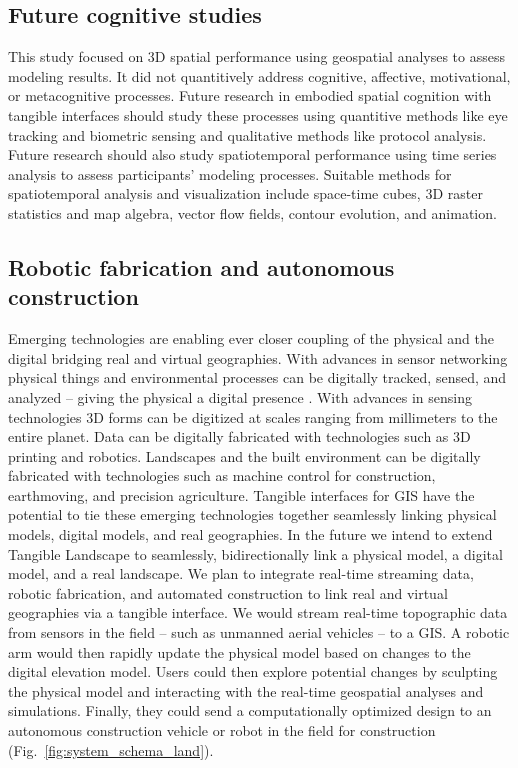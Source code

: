 \documentclass[prodmode,acmtochi]{acmsmall} %
\begin{document}
\subsection{Future cognitive studies}
\label{cog_sci}
%
This study focused on 3D spatial performance
using geospatial analyses to assess modeling results. 
%
It did not quantitively address 
cognitive, affective, motivational, or metacognitive processes. 
%
Future research in embodied spatial cognition with tangible interfaces 
should study these processes using quantitive methods like 
eye tracking and biometric sensing 
and qualitative methods like protocol analysis.  
%
Future research should also study spatiotemporal performance
using time series analysis to assess participants' modeling processes.
%
Suitable methods for spatiotemporal analysis and visualization include 
space-time cubes, 3D raster statistics and map algebra, 
vector flow fields, contour evolution, and animation.

\subsection{Robotic fabrication and autonomous construction}
\label{robotic_fab}
%
Emerging technologies are enabling ever closer coupling 
of the physical and the digital 
bridging real and virtual geographies. 
%
With advances in sensor networking 
physical things and environmental processes
can be digitally tracked, sensed, and analyzed  
-- giving the physical a digital presence \cite{Ratti2009,Resch2011}. 
%
With advances in sensing technologies
3D forms can be digitized at scales ranging from millimeters to the entire planet.
%
Data can be digitally fabricated with technologies such as 3D printing and robotics. 
%
Landscapes and the built environment can be digitally fabricated 
with technologies such as machine control 
for construction, earthmoving, and precision agriculture.
%
Tangible interfaces for GIS have the potential to 
tie these emerging technologies together 
seamlessly linking physical models, digital models, and real geographies. 
%
In the future we intend to extend Tangible Landscape to 
seamlessly, bidirectionally link 
a physical model, a digital model, and a real landscape.
%
We plan to integrate real-time streaming data, 
robotic fabrication, 
and automated construction 
to link real and virtual geographies via a tangible interface. 
%
We would stream real-time topographic data 
from sensors in the field -- such as unmanned aerial vehicles --
to a GIS. %
%
A robotic arm would then rapidly update the physical model 
based on changes to the digital elevation model. 
%
Users could then explore potential changes by sculpting the physical model
and interacting with the real-time geospatial analyses and simulations. 
Finally, they could send a computationally optimized design 
to an autonomous construction vehicle or robot in the field for construction 
(Fig.~\ref{fig:system_schema_land}). 
\end{document}
